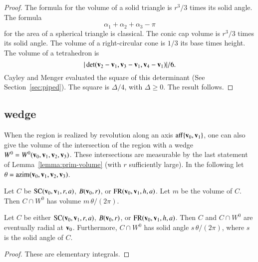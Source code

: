 \begin{proof}
The formula for the volume of a solid triangle is $r^3/3$ times
its solid angle.  The formula 
   \begin{displaymath}\alpha_1+\alpha_2+\alpha_3-\pi\end{displaymath}
for the area of a spherical triangle is classical.    
The conic cap volume is
$r^3/3$ times its solid angle.  
The volume of a right-circular cone is $1/3$ its base times height.
The volume of a tetrahedron is
   \begin{displaymath}|\det({\mathbf v}_2-{\mathbf v}_1,{\mathbf v}_3-{\mathbf v}_1,{\mathbf v}_4-{\mathbf v}_1)|/6.\end{displaymath}
Cayley and Menger evaluated the square of this determinant (See Section~\ref{sec:piped}).  The square is
$\Delta/4$, with $\Delta\ge0$.  The result follows.
\end{proof}
%



\subsection{wedge}\label{sec:wedge}
%

When the region is realized by revolution along an axis ${\operatorname{aff}}\{{\mathbf v}_0,{\mathbf v}_1\}$, 
one can also give the volume of the intersection of the region
with a wedge $W^0=W^0({\mathbf v}_0,{\mathbf v}_1,{\mathbf v}_2,{\mathbf v}_3)$.  These intersections are measurable
by the last statement of Lemma~\ref{lemma:prim-volume} (with $r$ sufficiently
large).
  In the following
let $\theta = {\operatorname{azim}}({\mathbf v}_0,{\mathbf v}_1,{\mathbf v}_2,{\mathbf v}_3)$.
%
%

\begin{lemma}  Let $C$ be ${\operatorname{SC}}({\mathbf v}_0,{\mathbf v}_1,r,a)$, $B({\mathbf v}_0,r)$, or
   ${\operatorname{FR}}({\mathbf v}_0,{\mathbf v}_1,h,a)$.  Let $m$ be the volume of $C$.  
   Then $C\cap W^0$ has volume $m\,\theta/(2\pi)$.   
\end{lemma}
%

\begin{lemma}  Let $C$ be either ${\operatorname{SC}}({\mathbf v}_0,{\mathbf v}_1,r,a)$, $B({\mathbf v}_0,r)$, or
   ${\operatorname{FR}}({\mathbf v}_0,{\mathbf v}_1,h,a)$.  Then $C$ and $C\cap W^0$ are eventually 
radial at ${\mathbf v}_0$. Furthermore,
    $C\cap W^0$ has solid angle 
  $s\,\theta/(2\pi)$, where $s$ is the solid angle of $C$.
\end{lemma}


\begin{proof}
These are elementary integrals.
\end{proof}


